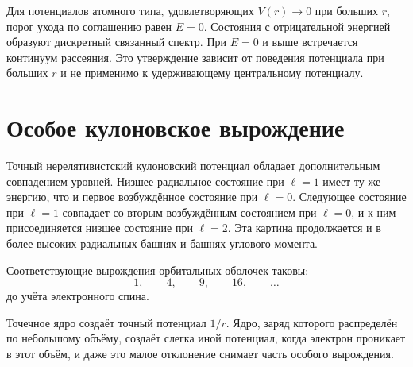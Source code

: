 Для потенциалов атомного типа, удовлетворяющих \(V(r)\to0\) при больших \(r\), порог ухода по соглашению равен \(E=0\). Состояния с отрицательной энергией образуют дискретный связанный спектр. При \(E=0\) и выше встречается континуум рассеяния. Это утверждение зависит от поведения потенциала при больших \(r\) и не применимо к удерживающему центральному потенциалу.

\section{Особое кулоновское вырождение}

Точный нерелятивистский кулоновский потенциал обладает дополнительным совпадением уровней. Низшее радиальное состояние при \(\ell=1\) имеет ту же энергию, что и первое возбуждённое состояние при \(\ell=0\). Следующее состояние при \(\ell=1\) совпадает со вторым возбуждённым состоянием при \(\ell=0\), и к ним присоединяется низшее состояние при \(\ell=2\). Эта картина продолжается и в более высоких радиальных башнях и башнях углового момента.

\begin{classroomqa}
\end{classroomqa}

Соответствующие вырождения орбитальных оболочек таковы:
\begin{equation}
1,\qquad 4,\qquad 9,\qquad 16,\qquad \ldots
\end{equation}
до учёта электронного спина.

\begin{classroomqa}
\end{classroomqa}

Точечное ядро создаёт точный потенциал \(1/r\). Ядро, заряд которого распределён по небольшому объёму, создаёт слегка иной потенциал, когда электрон проникает в этот объём, и даже это малое отклонение снимает часть особого вырождения.

